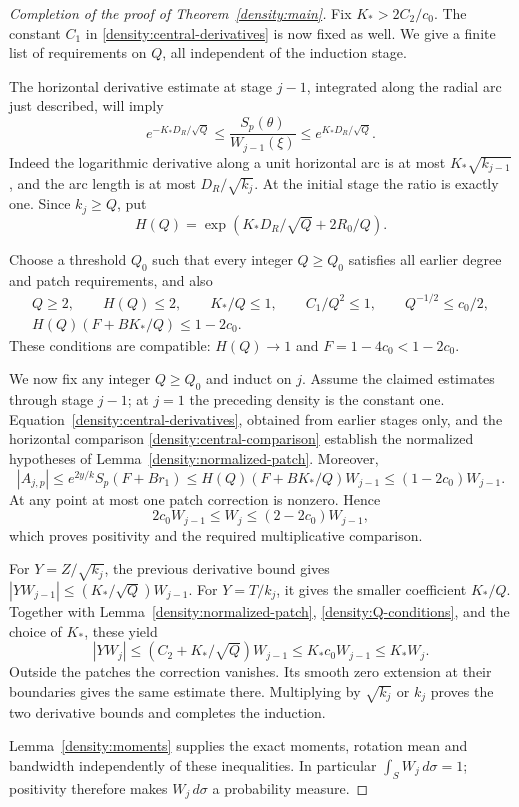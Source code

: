 \begin{proof}[Completion of the proof of Theorem~\ref{density:main}]
Fix \(K_*>2C_2/c_0\).  The constant \(C_1\) in
\eqref{density:central-derivatives} is now fixed as well.
We give a finite list of requirements on \(Q\), all independent of
the induction stage.

The horizontal derivative estimate at stage \(j-1\), integrated along
the radial arc just described, will imply
\begin{equation}\label{density:central-comparison}
 e^{-K_*D_R/\sqrt Q}
 \le\frac{S_p(\theta)}{W_{j-1}(\xi)}
 \le e^{K_*D_R/\sqrt Q}.
\end{equation}
Indeed the logarithmic derivative along a unit horizontal arc is at most
\(K_*\sqrt{k_{j-1}}\), and the arc length is at most \(D_R/\sqrt{k_j}\).
At the initial stage the ratio is exactly one.
Since \(k_j\ge Q\), put
\[
 H(Q)=\exp\left(K_*D_R/\sqrt Q+2R_0/Q\right).
\]

Choose a threshold \(Q_0\) such that every integer \(Q\ge Q_0\)
satisfies all earlier degree and patch requirements, and also
\begin{equation}\label{density:Q-conditions}
 \begin{gathered}
 Q\ge2,\qquad H(Q)\le2,\qquad
 K_*/Q\le1,\qquad C_1/Q^2\le1,\qquad
 Q^{-1/2}\le c_0/2,\\
 H(Q)(F+BK_*/Q)\le1-2c_0.
 \end{gathered}
\end{equation}
These conditions are compatible: \(H(Q)\to1\) and
\(F=1-4c_0<1-2c_0\).

We now fix any integer \(Q\ge Q_0\) and induct on \(j\).
Assume the claimed estimates through stage \(j-1\); at \(j=1\)
the preceding density is the constant one.
Equation~\eqref{density:central-derivatives}, obtained from earlier
stages only, and the horizontal comparison
\eqref{density:central-comparison} establish the normalized hypotheses
of Lemma~\ref{density:normalized-patch}.  Moreover,
\[
 |A_{j,p}|
 \le e^{2y/k}S_p(F+Br_1)
 \le H(Q)(F+BK_*/Q)W_{j-1}
 \le(1-2c_0)W_{j-1}.
\]
At any point at most one patch correction is nonzero.  Hence
\[
 2c_0W_{j-1}\le W_j\le(2-2c_0)W_{j-1},
\]
which proves positivity and the required multiplicative comparison.

For \(Y=Z/\sqrt{k_j}\), the previous derivative bound gives
\(|YW_{j-1}|\le(K_*/\sqrt Q)W_{j-1}\).
For \(Y=T/k_j\), it gives the smaller coefficient \(K_*/Q\).
Together with Lemma~\ref{density:normalized-patch},
\eqref{density:Q-conditions}, and the choice of \(K_*\), these yield
\[
 |YW_j|\le(C_2+K_*/\sqrt Q)W_{j-1}
 \le K_*c_0W_{j-1}\le K_*W_j.
\]
Outside the patches the correction vanishes.  Its smooth zero
extension at their boundaries gives the same estimate there.
Multiplying by \(\sqrt{k_j}\) or \(k_j\) proves the two derivative
bounds and completes the induction.

Lemma~\ref{density:moments} supplies the exact moments, rotation mean
and bandwidth independently of these inequalities.  In particular
\(\int_SW_j\,d\sigma=1\); positivity therefore makes
\(W_j\,d\sigma\) a probability measure.
\end{proof}

